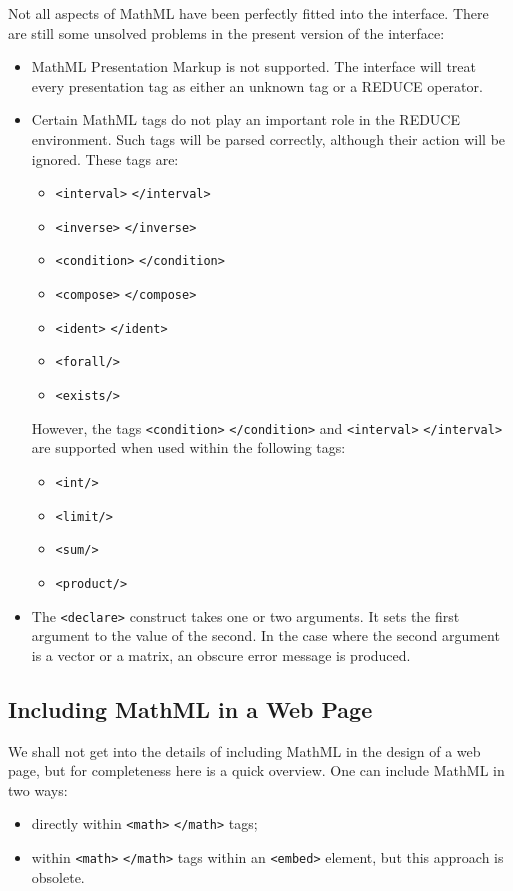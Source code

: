 Not all aspects of MathML have been perfectly fitted into the
interface.  There are still some unsolved problems in the present
version of the interface:
\begin{itemize}
\item MathML Presentation Markup is not supported.  The interface will
  treat every presentation tag as either an unknown tag or a REDUCE
  operator.
\item Certain MathML tags do not play an important role in the REDUCE
  environment.  Such tags will be parsed correctly, although their
  action will be ignored.  These tags are:
  \begin{itemize}
  \item \verb|<interval>| \verb|</interval>|
  \item \verb|<inverse>| \verb|</inverse>|
  \item \verb|<condition>| \verb|</condition>|
  \item \verb|<compose>| \verb|</compose>|
  \item \verb|<ident>| \verb|</ident>|
  \item \verb|<forall/>|
  \item \verb|<exists/>|
  \end{itemize}
  However, the tags \verb|<condition>| \verb|</condition>| and
  \verb|<interval>| \verb|</interval>| are supported when used within
  the following tags:
  \begin{itemize}
  \item \verb|<int/>|
  \item \verb|<limit/>|
  \item \verb|<sum/>|
  \item \verb|<product/>|
  \end{itemize}
\item The \verb|<declare>| construct takes one or two arguments.  It
  sets the first argument to the value of the second.  In the case
  where the second argument is a vector or a matrix, an obscure error
  message is produced.
\end{itemize}

\subsection{Including MathML in a Web Page}

We shall not get into the details of including MathML in the design of
a web page, but for completeness here is a quick overview.  One can
include MathML in two ways:
\begin{itemize}
\item directly within \verb|<math>| \verb|</math>| tags;
\item within \verb|<math>| \verb|</math>| tags within an
  \verb|<embed>| element, but this approach is obsolete.
\end{itemize}

